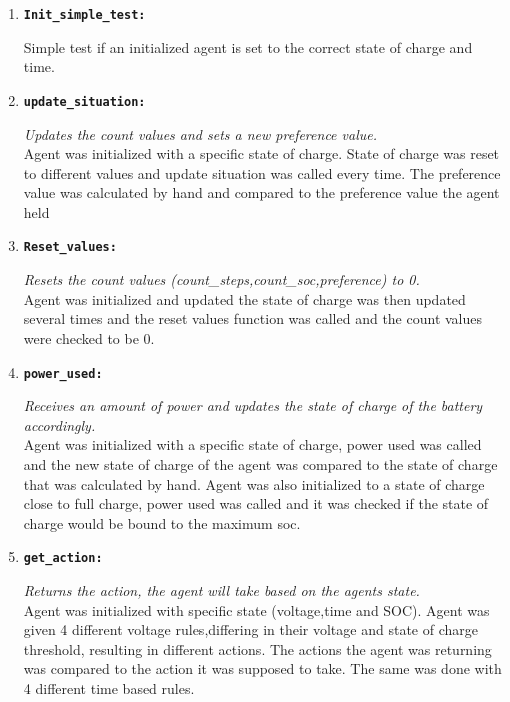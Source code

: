 \documentclass[a4paper]{article}
\begin{document}
\begin{enumerate}
 \item \begin{alltt}\textbf{Init_simple_test:}\end{alltt}
  Simple test if an initialized agent is set to the correct state of charge and time.
  
  \item \begin{alltt}\textbf{update_situation:}\end{alltt}
  \textit{Updates the count values and sets a new preference value.}\\
  Agent was initialized with a specific state of charge. State of charge was reset to different values and
  update situation was called every time. The preference value was calculated by hand and compared to 
  the preference value the agent held
  
  \item \begin{alltt}\textbf{Reset_values:}\end{alltt} 
  \textit{Resets the count values (count\_steps,count\_soc,preference) to 0.} \\
  Agent was initialized  and updated the state of charge was then updated several times and 
  the reset values function was called and the count values were checked to be 0.
  
  \item \begin{alltt}\textbf{power_used:}\end{alltt} 
  \textit{Receives an amount of power and updates the state of charge of the battery accordingly.}\\
  Agent was initialized  with a specific state of charge, power used was called and the new state of charge 
  of the agent was compared to the state of charge that was calculated by hand. Agent was also initialized 
  to a state of charge close to full charge, power used was called and it was checked if the state of charge
  would be bound to the maximum soc.
  
  \item \begin{alltt}\textbf{get_action:}\end{alltt}
  \textit{Returns the action, the agent will take based on the agents state.}\\
  Agent was initialized with specific state (voltage,time and SOC). Agent was given 4 different 
  voltage rules,differing in their voltage and state of charge threshold, resulting in different actions.
  The actions the agent was returning was compared to the action it was supposed to take. The same was done
  with 4 different time based rules.
  

\end{enumerate}
\end{document}
